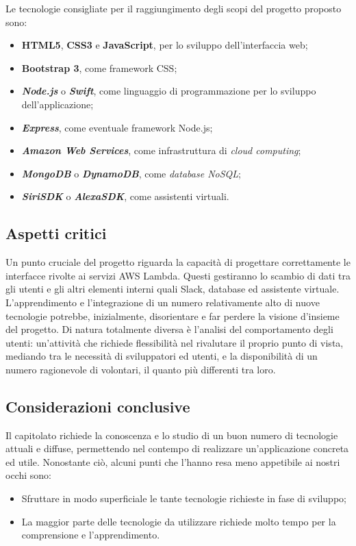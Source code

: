 Le tecnologie consigliate per il raggiungimento degli scopi del progetto proposto sono:
\begin{itemize}
	\item \textbf{HTML5}, \textbf{CSS3} e \textbf{JavaScript}, per lo sviluppo dell'interfaccia web;
	\item \textbf{Bootstrap 3}, come framework CSS;
	\item \textbf{\textit{Node.js}} o \textbf{\textit{Swift}}, come linguaggio di programmazione per lo
	sviluppo dell'applicazione;
	\item \textbf{\textit{Express}}, come eventuale framework Node.js;
	\item \textbf{\textit{Amazon Web Services}}, come infrastruttura di \textit{cloud computing};
	\item \textbf{\textit{MongoDB}} o \textbf{\textit{DynamoDB}}, come \textit{database NoSQL};
	\item \textbf{\textit{SiriSDK}} o \textbf{\textit{AlexaSDK}}, come assistenti virtuali.
\end{itemize}

\subsection{Aspetti critici}

Un punto cruciale del progetto riguarda la capacità di progettare
correttamente le interfacce rivolte ai servizi AWS Lambda. Questi gestiranno lo scambio di dati tra gli utenti e gli altri elementi
interni quali Slack, database ed assistente virtuale. L'apprendimento e l'integrazione di un numero relativamente alto di nuove tecnologie potrebbe, inizialmente, disorientare e far perdere la visione d'insieme del progetto.
Di natura totalmente diversa è l'analisi del comportamento degli
utenti: un'attività che richiede flessibilità nel rivalutare il proprio
punto di vista, mediando tra le necessità di sviluppatori ed utenti,
e la disponibilità di un numero ragionevole di volontari, il quanto più differenti tra loro.

\subsection{Considerazioni conclusive}

Il capitolato richiede la conoscenza e lo studio di un buon numero di tecnologie attuali e diffuse, permettendo nel contempo di realizzare un'applicazione concreta ed utile. Nonostante ciò, alcuni punti che l'hanno resa meno appetibile ai nostri occhi sono:
\begin{itemize}
	\item Sfruttare in modo superficiale le tante tecnologie richieste in fase di sviluppo;
	\item La maggior parte delle tecnologie da utilizzare richiede molto tempo per la comprensione e l'apprendimento.
\end{itemize}

